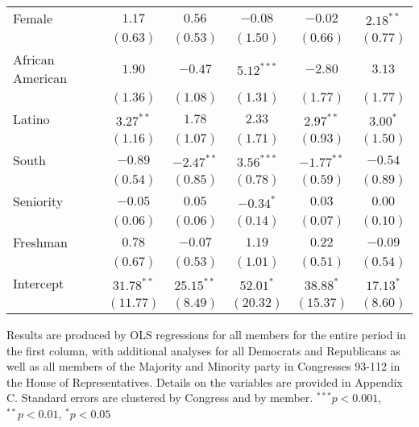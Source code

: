 \documentclass[12pt]{article}
\begin{document}
\begin{table}[H]
\begin{threeparttable}
\begin{tabular}{l c c c c c }
Female                & $1.17$       & $0.56$       & $-0.08$      & $-0.02$       & $2.18^{**}$  \\
                      & $(0.63)$     & $(0.53)$     & $(1.50)$     & $(0.66)$      & $(0.77)$     \\
African American      & $1.90$       & $-0.47$      & $5.12^{***}$ & $-2.80$       & $3.13$       \\
                      & $(1.36)$     & $(1.08)$     & $(1.31)$     & $(1.77)$      & $(1.77)$     \\
Latino                & $3.27^{**}$  & $1.78$       & $2.33$       & $2.97^{**}$   & $3.00^{*}$   \\
                      & $(1.16)$     & $(1.07)$     & $(1.71)$     & $(0.93)$      & $(1.50)$     \\
South                 & $-0.89$      & $-2.47^{**}$ & $3.56^{***}$ & $-1.77^{**}$  & $-0.54$      \\
                      & $(0.54)$     & $(0.85)$     & $(0.78)$     & $(0.59)$      & $(0.89)$     \\
Seniority             & $-0.05$      & $0.05$       & $-0.34^{*}$  & $0.03$        & $0.00$       \\
                      & $(0.06)$     & $(0.06)$     & $(0.14)$     & $(0.07)$      & $(0.10)$     \\
Freshman              & $0.78$       & $-0.07$      & $1.19$       & $0.22$        & $-0.09$      \\
                      & $(0.67)$     & $(0.53)$     & $(1.01)$     & $(0.51)$      & $(0.54)$     \\
Intercept             & $31.78^{**}$ & $25.15^{**}$ & $52.01^{*}$  & $38.88^{*}$   & $17.13^{*}$  \\
                      & $(11.77)$    & $(8.49)$     & $(20.32)$    & $(15.37)$     & $(8.60)$     \\
\hline
\end{tabular}
\begin{tablenotes}
   \item
   Results are produced by OLS regressions for all members for the entire period in the first column, with additional analyses for all Democrats and Republicans as well as all members of the Majority and Minority party in Congresses 93-112 in the House of Representatives. Details on the variables are provided in Appendix C.
   Standard errors are clustered by Congress and by member.
$^{***}p<0.001$, $^{**}p<0.01$, $^*p<0.05$
 \end{tablenotes}
\end{threeparttable}
\end{table}
\end{document}
